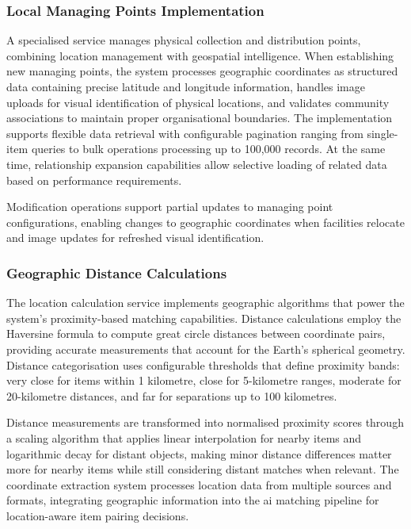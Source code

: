 \subsubsection{Local Managing Points Implementation}

A specialised service manages physical collection and distribution points, combining location management with geospatial intelligence. When establishing new managing points, the system processes geographic coordinates as structured data containing precise latitude and longitude information, handles image uploads for visual identification of physical locations, and validates community associations to maintain proper organisational boundaries. The implementation supports flexible data retrieval with configurable pagination ranging from single-item queries to bulk operations processing up to 100,000 records. At the same time, relationship expansion capabilities allow selective loading of related data based on performance requirements.

Modification operations support partial updates to managing point configurations, enabling changes to geographic coordinates when facilities relocate and image updates for refreshed visual identification.

\subsubsection{Geographic Distance Calculations}

The location calculation service implements geographic algorithms that power the system's proximity-based matching capabilities. Distance calculations employ the Haversine formula \cite{Sinnott1984} to compute great circle distances between coordinate pairs, providing accurate measurements that account for the Earth's spherical geometry. Distance categorisation uses configurable thresholds that define proximity bands: very close for items within 1 kilometre, close for 5-kilometre ranges, moderate for 20-kilometre distances, and far for separations up to 100 kilometres.

Distance measurements are transformed into normalised proximity scores through a scaling algorithm that applies linear interpolation for nearby items and logarithmic decay for distant objects, making minor distance differences matter more for nearby items while still considering distant matches when relevant. The coordinate extraction system processes location data from multiple sources and formats, integrating geographic information into the \ac{ai} matching pipeline for location-aware item pairing decisions.


